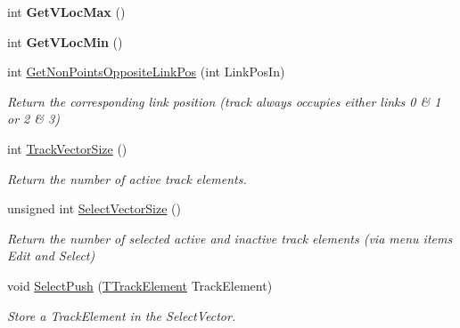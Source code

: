 \begin{DoxyCompactItemize}
\mbox{\label{class_t_track_a5c13595c171f5c7e4aaa6dfc18f4359f}} 
int {\bfseries Get\+V\+Loc\+Max} ()
\item 
\mbox{\label{class_t_track_ac42bd1e1e148a91396310b1077d2d8e0}} 
int {\bfseries Get\+V\+Loc\+Min} ()
\item 
\mbox{\label{class_t_track_aeb515d40cb9b08ed55ce877ffdbc51a5}} 
int \mbox{\hyperlink{class_t_track_aeb515d40cb9b08ed55ce877ffdbc51a5}{Get\+Non\+Points\+Opposite\+Link\+Pos}} (int Link\+Pos\+In)
\begin{DoxyCompactList}\small\item\em Return the corresponding link position (track always occupies either links 0 \& 1 or 2 \& 3) \end{DoxyCompactList}\item 
\mbox{\label{class_t_track_a55d9415e3ecac804f3345dddd74f9bad}} 
int \mbox{\hyperlink{class_t_track_a55d9415e3ecac804f3345dddd74f9bad}{Track\+Vector\+Size}} ()
\begin{DoxyCompactList}\small\item\em Return the number of active track elements. \end{DoxyCompactList}\item 
\mbox{\label{class_t_track_a3cae8cc2dc72d74cf0d24dbc4148c591}} 
unsigned int \mbox{\hyperlink{class_t_track_a3cae8cc2dc72d74cf0d24dbc4148c591}{Select\+Vector\+Size}} ()
\begin{DoxyCompactList}\small\item\em Return the number of selected active and inactive track elements (via menu items \textquotesingle{}Edit\textquotesingle{} and \textquotesingle{}Select\textquotesingle{}) \end{DoxyCompactList}\item 
\mbox{\label{class_t_track_a512c7a382dec9379b6796c73363599e5}} 
void \mbox{\hyperlink{class_t_track_a512c7a382dec9379b6796c73363599e5}{Select\+Push}} (\mbox{\hyperlink{class_t_track_element}{T\+Track\+Element}} Track\+Element)
\begin{DoxyCompactList}\small\item\em Store a Track\+Element in the Select\+Vector. \end{DoxyCompactList}\item 

\end{DoxyCompactItemize}
